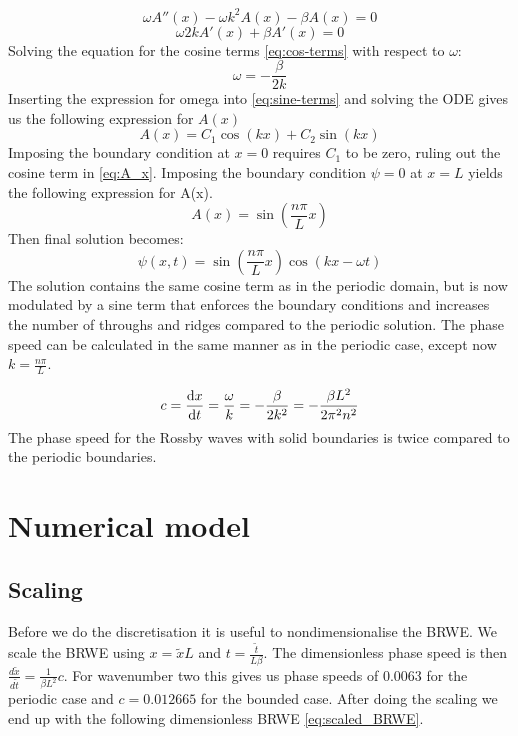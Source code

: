 \begin{equation}\label{eq:sine-terms}
    \omega A''(x) -\omega k^2 A(x) - \beta A(x) = 0
\end{equation}
\begin{equation}\label{eq:cos-terms}
    \omega 2 k A'(x) + \beta A'(x) = 0
\end{equation}
Solving the equation for the cosine terms \cref{eq:cos-terms} with respect to
$\omega$:
\begin{equation}
    \omega = -\frac{\beta}{2k}
\end{equation}
Inserting the expression for omega into \cref{eq:sine-terms} and solving the ODE
gives us the following expression for $A(x)$
\begin{equation}\label{eq:A_x}
    A(x) = C_1 \cos{(kx) + C_2 \sin{(kx)}}
\end{equation}
Imposing the boundary condition at $x=0$ requires $C_1$ to be zero, ruling
out the cosine term in \cref{eq:A_x}. Imposing the boundary condition $\psi=0$
at $x=L$ yields the following expression for A(x).
\begin{equation}
    A(x) = \sin{\left(\frac{n\pi}{L} x \right)}
\end{equation}
Then final solution becomes:
\begin{equation}
    \psi(x,t) = \sin{\left(\frac{n\pi}{L} x \right)} \cos{(kx - \omega t)}
\end{equation}
The solution contains the same cosine term as in the periodic domain, but is now
modulated by a sine term that enforces the boundary conditions and increases
the number of throughs and ridges compared to the periodic solution.
The phase speed can be calculated in the same manner as in the periodic case,
except now $k=\frac{n\pi}{L}$.

\begin{equation}
    c = \dv{x}{t} = \frac{\omega}{k} = -\frac{\beta}{2k^2} = -\frac{\beta L^2}{2
    \pi^2 n^2}
\end{equation}
The phase speed for the Rossby waves with solid boundaries is twice compared to
the periodic boundaries.

\section{Numerical model}


\subsection{Scaling}
Before we do the discretisation it is useful to nondimensionalise the BRWE.
We scale the BRWE using $x = \tilde{x} L $ and $t = \frac{\tilde{t}}{L \beta}$.
The dimensionless phase speed is then $\frac{d\tilde{x}}{d\tilde{t}} = \frac{1}
{\beta L^2} c$. For wavenumber two this gives us phase speeds of
$0.0063$ for the periodic case and $c = 0.012665$ for the bounded case.
After doing the scaling we end up with the following dimensionless BRWE
\cref{eq:scaled_BRWE}.

